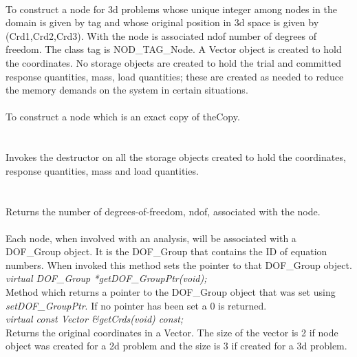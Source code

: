\\
To construct a node for 3d problems whose unique integer among nodes in the
domain is given by \p tag and whose original position in 3d space
is given by (Crd1,Crd2,Crd3). With the node is associated \p ndof number
of degrees of freedom. The class tag is NOD\_TAG\_Node. A Vector object
is created to hold the coordinates. No
storage objects are created to hold the trial and committed response
quantities, mass, load quantities; these are created as needed to
reduce the memory demands on the system in certain situations. \\ 



\\
To construct a node which is an exact copy of \p theCopy. \\

  \\
 \\
Invokes the destructor on all the storage objects created to hold the coordinates,
response quantities, mass and load quantities. \\

  \\
\\
Returns the number of degrees-of-freedom, \p ndof, associated with
the node. \\

 \\
Each node, when involved with an analysis, will be associated with a
DOF\_Group object. It is the DOF\_Group that contains the ID of equation
numbers. When invoked this method sets the pointer to that DOF\_Group object. \\

{\em virtual DOF\_Group *getDOF\_GroupPtr(void);} \\
Method which returns a pointer to the DOF\_Group object that was set
using {\em setDOF\_GroupPtr}. If no pointer has been set a $0$ is
returned. \\

{\em virtual const Vector \&getCrds(void) const;}  \\
Returns the original coordinates in a Vector. The size of the vector
is 2 if node object was created for a 2d problem and the size is 3 if
created for a 3d problem. \\

